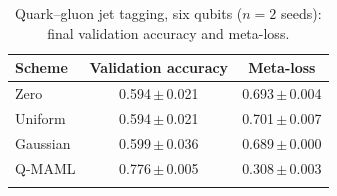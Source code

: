 \begin{table}[!htb]
\centering
\caption{Quark--gluon jet tagging, six qubits ($n=2$ seeds): final validation accuracy and meta-loss.}\label{tab:supp_qg}
\begin{tabular}{@{}lcc@{}}
\toprule
Scheme & Validation accuracy & Meta-loss \\
\midrule
Zero & 0.594\,$\pm$\,0.021 & 0.693\,$\pm$\,0.004 \\
Uniform & 0.594\,$\pm$\,0.021 & 0.701\,$\pm$\,0.007 \\
Gaussian & 0.599\,$\pm$\,0.036 & 0.689\,$\pm$\,0.000 \\
Q-MAML & 0.776\,$\pm$\,0.005 & 0.308\,$\pm$\,0.003 \\
\botrule
\end{tabular}
\end{table}
